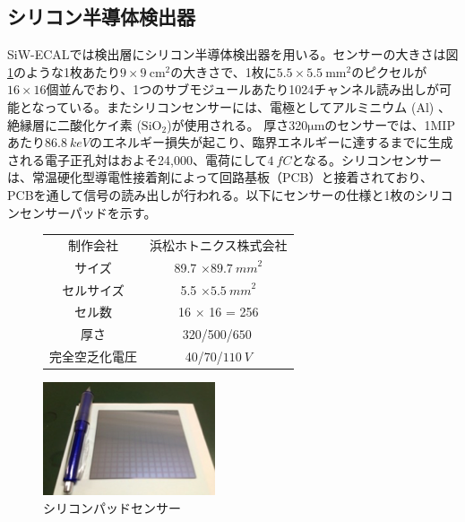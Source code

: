 \subsection{シリコン半導体検出器}
SiW-ECALでは検出層にシリコン半導体検出器を用いる。センサーの大きさは図\ref{sensor}のような1枚あたり$9 \times 9\: \mathrm{{cm}^2}$の大きさで、1枚に$5.5 \times 5.5\: {\mathrm{mm}^2}$のピクセルが$16 \times 16$個並んでおり、1つのサブモジュールあたり1024チャンネル読み出しが可能となっている。またシリコンセンサーには、電極としてアルミニウム ($\mathrm{Al}$) 、絶縁層に二酸化ケイ素 ($\mathrm{SiO_2}$)が使用される。 厚さ320$\mathrm{\mu m}$のセンサーでは、1MIPあたり$\SI{86.8}{keV}$のエネルギー損失が起こり、臨界エネルギーに達するまでに生成される電子正孔対はおよそ24,000、電荷にして$\SI{4}{fC}$となる。シリコンセンサーは、常温硬化型導電性接着剤によって回路基板（PCB）と接着されており、PCBを通して信号の読み出しが行われる。以下にセンサーの仕様と1枚のシリコンセンサーパッドを示す。
\begin{figure}[H]
 \begin{minipage}[h]{.45\linewidth}
 \def\@captype{table}
   \centering
   \begin{tabular}{|c|c|}
         \hline
   	制作会社 & 浜松ホトニクス株式会社\\
	サイズ & 89.7 $\times \SI{89.7}{mm}^2 $ \\
	セルサイズ & 5.5 $\times \SI{5.5}{mm}^2 $\\
	セル数 & 16 $\times$ 16 = 256\\
	厚さ & 320/500/$\SI{650}{}$\\
	完全空乏化電圧 & 40/70/$\SI{110}{V}$\\
        \hline
  \end{tabular}
\end{minipage}
\hfill
\begin{minipage}[h]{.45\linewidth}
	\begin{center}
 \includegraphics[keepaspectratio, scale=0.8]
 	{Figure/Siwecal/si_sensor.png}
 		\caption[シリコンパッドセンサー]{シリコンパッドセンサー~\cite{sipad}}
 		\label{sensor}
	\end{center}
\end{minipage}
\end{figure}
